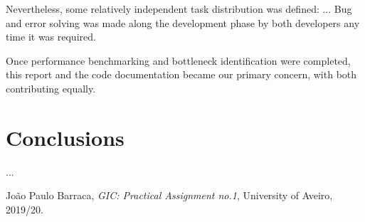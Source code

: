 \documentclass[12pt]{article}
\begin{document}
Nevertheless, some relatively independent task distribution was defined: ...
Bug and error solving was made along the development phase by both developers any time it was required.

Once performance benchmarking and bottleneck identification were completed, this report and the code documentation became our primary concern, with both 
contributing equally.

\newpage
\section*{Conclusions} \label{conclusions} %

...

\begin{thebibliography}{9} %
  

    João Paulo Barraca,
    \textit{GIC: Practical Assignment no.1},
    University of Aveiro,
    2019/20.

\end{thebibliography}

\clearpage
\end{document}
